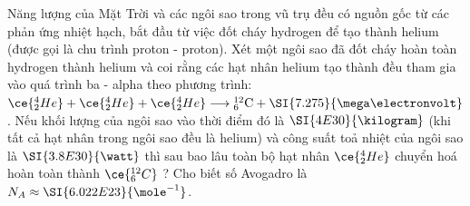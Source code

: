 \begin{ex}
	Năng lượng của Mặt Trời và các ngôi sao trong vũ trụ đều có nguồn gốc từ các phản ứng nhiệt hạch, bắt đầu từ việc đốt cháy hydrogen để tạo thành helium (được gọi là chu trình proton - proton). Xét một ngôi sao đã đốt cháy hoàn toàn hydrogen thành helium và coi rằng các hạt nhân helium tạo thành đều tham gia vào quá trình ba - alpha theo phương trình: $\ce{_2^4He}+\ce{_2^4He}+\ce{_2^4He} \longrightarrow \mathrm{_6^{12}C}+\SI{7.275}{\mega\electronvolt}$. Nếu khối lượng của ngôi sao vào thời điểm đó là $\SI{4E30}{\kilogram}$ (khi tất cả hạt nhân trong ngôi sao đều là helium) và công suất toả nhiệt của ngôi sao là $\SI{3.8E30}{\watt}$ thì sau bao lâu toàn bộ hạt nhân $\ce{_2^4He}$ chuyển hoá hoàn toàn thành $ \ce{_6^{12}C}$ ? Cho biết số Avogadro là $N_{A} \approx \SI{6.022E23}{\mole^{-1}}$.
\end{ex}
